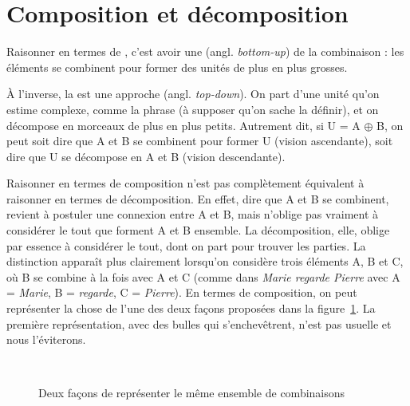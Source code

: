 \section{Composition et décomposition}\label{sec:3.2.13}

Raisonner en termes de , c’est avoir une  (angl. \textit{bottom-up}) de la combinaison : les éléments se combinent pour former des unités de plus en plus grosses.

À l’inverse, la  est une approche  (angl. \textit{top-down}). On part d’une unité qu’on estime complexe, comme la phrase (à supposer qu’on sache la définir), et on décompose en morceaux de plus en plus petits. Autrement dit, si U = A ${\oplus}$ B, on peut soit dire que A et B se combinent pour former U (vision ascendante), soit dire que U se décompose en A et B (vision descendante).

Raisonner en termes de composition n’est pas complètement équivalent à raisonner en termes de décomposition. En effet, dire que A et B se combinent, revient à postuler une connexion entre A et B, mais n’oblige pas vraiment à considérer le tout que forment A et B ensemble. La décomposition, elle, oblige par essence à considérer le tout, dont on part pour trouver les parties. La distinction apparaît plus clairement lorsqu’on considère trois éléments A, B et C, où B se combine à la fois avec A et C (comme dans \textit{Marie regarde Pierre} avec A = \textit{Marie}, B = \textit{regarde}, C = \textit{Pierre}). En termes de composition, on peut représenter la chose de l’une des deux façons proposées dans la figure~\ref{fig:combiABC}. La première représentation, avec des bulles qui s’enchevêtrent, n’est pas usuelle et nous l’éviterons.


\begin{figure}
\medskip\\

\caption{\label{fig:combiABC}Deux façons de représenter le même ensemble de combinaisons}
\end{figure}


